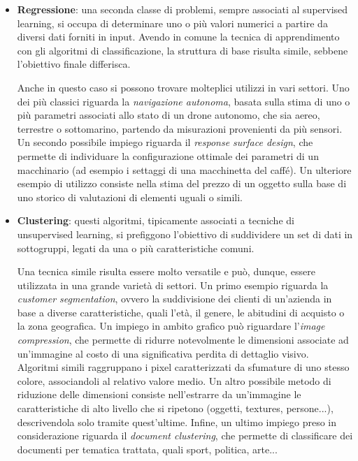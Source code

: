 \begin{itemize}
        Infine, un'interessante conseguenza di un procedimento di questo tipo è la possibilità di ottenere, tramite una sorta di reverse engineering, informazioni sulle caratteristiche comuni di un oggetto che appartiene ad una specifica classe. 

        \item \textbf{Regressione}: una seconda classe di problemi, sempre associati al supervised learning, si occupa di determinare uno o più valori numerici a partire da diversi dati forniti in input. Avendo in comune la tecnica di apprendimento con gli algoritmi di classificazione, la struttura di base risulta simile, sebbene l'obiettivo finale differisca. 
        
        Anche in questo caso si possono trovare molteplici utilizzi in vari settori. Uno dei più classici riguarda la \emph{navigazione autonoma}, basata sulla stima di uno o più parametri associati allo stato di un drone autonomo, che sia aereo, terrestre o sottomarino, partendo da misurazioni provenienti da più sensori. Un secondo possibile impiego riguarda il \emph{response surface design}, che permette di individuare la configurazione ottimale dei parametri di un macchinario (ad esempio i settaggi di una macchinetta del caffé). Un ulteriore esempio di utilizzo consiste nella stima del prezzo di un oggetto sulla base di uno storico di valutazioni di elementi uguali o simili. 
        
        \item \textbf{Clustering}: questi algoritmi, tipicamente associati a tecniche di unsupervised learning, si prefiggono l'obiettivo di suddividere un set di dati in sottogruppi, legati da una o più caratteristiche comuni. 
        
        Una tecnica simile risulta essere molto versatile e può, dunque, essere utilizzata in una grande varietà di settori. Un primo esempio riguarda la \emph{customer segmentation}, ovvero la suddivisione dei clienti di un'azienda in base a diverse caratteristiche, quali l'età, il genere, le abitudini di acquisto o la zona geografica. Un impiego in ambito grafico può riguardare l'\emph{image compression}, che permette di ridurre notevolmente le dimensioni associate ad un'immagine al costo di una significativa perdita di dettaglio visivo. Algoritmi simili raggruppano i pixel caratterizzati da sfumature di uno stesso colore, associandoli al relativo valore medio. Un altro possibile metodo di riduzione delle dimensioni consiste nell'estrarre da un'immagine le caratteristiche di alto livello che si ripetono (oggetti, textures, persone...), descrivendola solo tramite quest'ultime. Infine, un ultimo impiego preso in considerazione riguarda il \emph{document clustering}, che permette di classificare dei documenti per tematica trattata, quali sport, politica, arte...
        
    \end{itemize}

